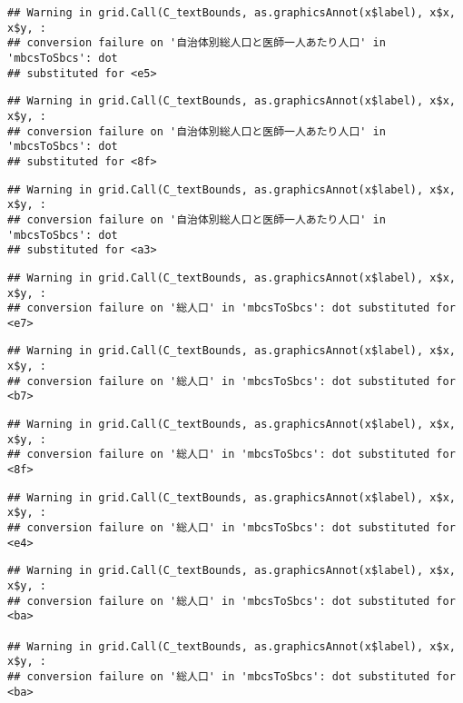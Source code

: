 \documentclass[
]{article}
\begin{document}
\begin{verbatim}
## Warning in grid.Call(C_textBounds, as.graphicsAnnot(x$label), x$x, x$y, :
## conversion failure on '自治体別総人口と医師一人あたり人口' in 'mbcsToSbcs': dot
## substituted for <e5>
\end{verbatim}

\begin{verbatim}
## Warning in grid.Call(C_textBounds, as.graphicsAnnot(x$label), x$x, x$y, :
## conversion failure on '自治体別総人口と医師一人あたり人口' in 'mbcsToSbcs': dot
## substituted for <8f>
\end{verbatim}

\begin{verbatim}
## Warning in grid.Call(C_textBounds, as.graphicsAnnot(x$label), x$x, x$y, :
## conversion failure on '自治体別総人口と医師一人あたり人口' in 'mbcsToSbcs': dot
## substituted for <a3>
\end{verbatim}

\begin{verbatim}
## Warning in grid.Call(C_textBounds, as.graphicsAnnot(x$label), x$x, x$y, :
## conversion failure on '総人口' in 'mbcsToSbcs': dot substituted for <e7>
\end{verbatim}

\begin{verbatim}
## Warning in grid.Call(C_textBounds, as.graphicsAnnot(x$label), x$x, x$y, :
## conversion failure on '総人口' in 'mbcsToSbcs': dot substituted for <b7>
\end{verbatim}

\begin{verbatim}
## Warning in grid.Call(C_textBounds, as.graphicsAnnot(x$label), x$x, x$y, :
## conversion failure on '総人口' in 'mbcsToSbcs': dot substituted for <8f>
\end{verbatim}

\begin{verbatim}
## Warning in grid.Call(C_textBounds, as.graphicsAnnot(x$label), x$x, x$y, :
## conversion failure on '総人口' in 'mbcsToSbcs': dot substituted for <e4>
\end{verbatim}

\begin{verbatim}
## Warning in grid.Call(C_textBounds, as.graphicsAnnot(x$label), x$x, x$y, :
## conversion failure on '総人口' in 'mbcsToSbcs': dot substituted for <ba>

## Warning in grid.Call(C_textBounds, as.graphicsAnnot(x$label), x$x, x$y, :
## conversion failure on '総人口' in 'mbcsToSbcs': dot substituted for <ba>
\end{verbatim}
\end{document}

